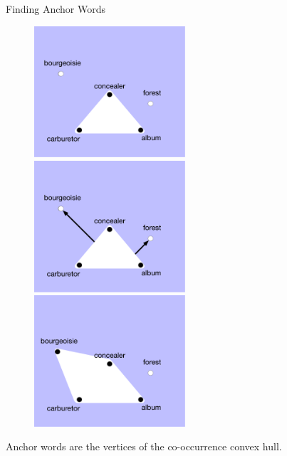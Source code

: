 \begin{frame}{Finding Anchor Words}
\begin{figure}
\begin{overprint}
\centerline{\includegraphics[width=0.5\textwidth]{topic_models/mtanchor/mono_anchors1.pdf}}
\centerline{\includegraphics[width=0.5\textwidth]{topic_models/mtanchor/mono_anchors2.pdf}}
\centerline{\includegraphics[width=0.5\textwidth]{topic_models/mtanchor/mono_anchors3.pdf}}
\end{overprint}
\end{figure}
\center Anchor words are the vertices of the co-occurrence convex hull.
\end{frame}


